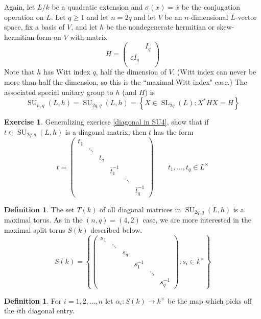 \documentclass[12pt]{article}
\theoremstyle{definition}
\newtheorem{definition}[theorem]{Definition}
\newtheorem{exercise}[theorem]{Exercise}
\numberwithin{theorem}{subsection}
\newcommand{\sig}{\sigma}
\newcommand{\eps}{\varepsilon}
\newcommand{\lb}{\left\{}
\newcommand{\rb}{\right\}}
\newcommand{\inv}{^{-1}}
\newcommand{\ov}{\overline}
\DeclareMathOperator{\SL}{SL}
\DeclareMathOperator{\SU}{SU}
\begin{document}
Again, let $L/k$ be a quadratic extension and $\sig(x) = \ov x$ be the conjugation operation on $L$. Let $q \ge 1$ and let $n = 2q$ and let $V$ be an $n$-dimensional $L$-vector space, fix a basis of $V$, and let $h$ be the nondegenerate hermitian or skew-hermitian form on $V$ with matrix
\[
H =
	\begin{pmatrix}
		& I_q \\
		\eps I_q \\
	\end{pmatrix}
\]
Note that $h$ has Witt index $q$, half the dimension of $V$. (Witt index can never be more than half the dimension, so this is the ``maximal Witt index" case.) The associated special unitary group to $h$ (and $H$) is
\[
	\SU_{n,q}(L,h) = \SU_{2q,q}(L,h) = \lb X \in \SL_{2q}(L) : X^*H X = H \rb
\]

\begin{exercise}
Generalizing exericse \ref{diagonal in SU4}, show that if $t \in \SU_{2q,q}(L,h)$ is a diagonal matrix, then $t$ has the form
\[
	t = \begin{pmatrix}
		t_1 \\
		& \ddots \\
		&& t_q \\
		&&& \ov t_1 \inv \\
		&&&& \ddots \\
		&&&&& \ov t_q \inv
	\end{pmatrix}
	\qquad t_1, \ldots, t_q \in L^\times
\]
\end{exercise}

\begin{definition}
The set $T(k)$ of all diagonal matrices in $\SU_{2q,q}(L,h)$ is a maximal torus. As in the $(n,q) = (4,2)$ case, we are more interested in the maximal split torus $S(k)$ described below.
\[
	S(k) =
	\lb
	\begin{pmatrix}
		s_1 \\
		& \ddots \\
		&& s_q \\
		&&& s_1 \inv \\
		&&&& \ddots \\
		&&&&& s_q \inv
	\end{pmatrix}
		: s_i \in k^\times
	\rb
\]
\end{definition}

\begin{definition}
For $i=1, 2, \ldots, n$ let $\alpha_i:S(k) \to k^\times$ be the map which picks off the $i$th diagonal entry.
\end{definition}
\end{document}
